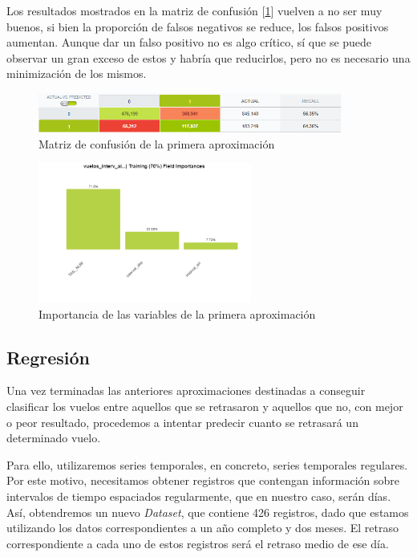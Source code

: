 \documentclass[format=acmsmall, review=false, screen=true]{acmart}
\begin{document}
Los resultados mostrados en la matriz de confusión [\ref{fig:ConfMatrixAprox2}] vuelven a no ser muy buenos, si bien la proporción de falsos negativos se reduce, los falsos positivos aumentan. Aunque dar un falso positivo no es algo crítico, sí que se puede observar un gran exceso de estos y habría que reducirlos, pero no es necesario una minimización de los mismos.

\begin{figure}[htb]
	\centering
	\includegraphics[width=10cm]{ConfMatrixAprox2.png}
	\caption{Matriz de confusión de la primera aproximación}
	\label{fig:ConfMatrixAprox2}
\end{figure}

\begin{figure}[htb]
	\centering
	\includegraphics[width=7cm]{ImportanciaAprox2.png}
	\caption{Importancia de las variables de la primera aproximación}
	\label{fig:ImportanciaAprox2}
\end{figure}




\subsection{Regresión}
Una vez terminadas las anteriores aproximaciones destinadas a conseguir clasificar los vuelos entre aquellos que se retrasaron y aquellos que no, con mejor o peor resultado, procedemos a intentar predecir cuanto se retrasará un determinado vuelo.

Para ello, utilizaremos series temporales, en concreto, series temporales regulares. Por este motivo, necesitamos obtener registros que contengan información sobre intervalos de tiempo espaciados regularmente, que en nuestro caso, serán días. Así, obtendremos un nuevo \textit{Dataset}, que contiene 426 registros, dado que estamos utilizando los datos correspondientes a un año completo y dos meses. El retraso correspondiente a cada uno de estos registros será el retraso medio de ese día.
\end{document}
